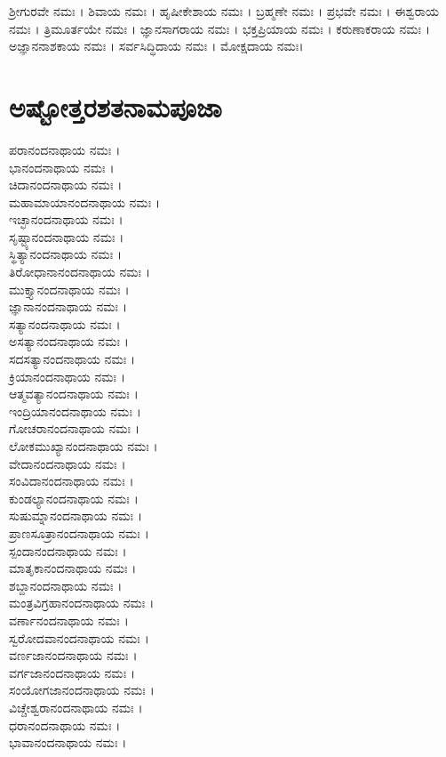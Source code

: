 ಶ್ರೀಗುರವೇ ನಮಃ ।
ಶಿವಾಯ ನಮಃ ।
ಹೃಷೀಕೇಶಾಯ ನಮಃ ।
ಬ್ರಹ್ಮಣೇ ನಮಃ ।
ಪ್ರಭವೇ ನಮಃ ।
ಈಶ್ವರಾಯ ನಮಃ ।
ತ್ರಿಮೂರ್ತಯೇ ನಮಃ ।
ಜ್ಞಾನಸಾಗರಾಯ ನಮಃ ।
ಭಕ್ತಪ್ರಿಯಾಯ ನಮಃ ।
ಕರುಣಾಕರಾಯ ನಮಃ ।
ಅಜ್ಞಾನನಾಶಕಾಯ ನಮಃ ।
ಸರ್ವಸಿದ್ಧಿದಾಯ ನಮಃ ।
ಮೋಕ್ಷದಾಯ ನಮಃ।
\section{ಅಷ್ಟೋತ್ತರಶತನಾಮಪೂಜಾ}
ಪರಾನಂದನಾಥಾಯ ನಮಃ ।\\
ಭಾನಂದನಾಥಾಯ ನಮಃ ।\\
ಚಿದಾನಂದನಾಥಾಯ ನಮಃ ।\\
ಮಹಾಮಾಯಾನಂದನಾಥಾಯ ನಮಃ ।\\
ಇಚ್ಛಾನಂದನಾಥಾಯ ನಮಃ ।\\
ಸೃಷ್ಟ್ಯಾನಂದನಾಥಾಯ ನಮಃ ।\\
ಸ್ಥಿತ್ಯಾನಂದನಾಥಾಯ ನಮಃ ।\\
ತಿರೋಧಾನಾನಂದನಾಥಾಯ ನಮಃ ।\\
ಮುಕ್ತ್ಯಾನಂದನಾಥಾಯ ನಮಃ ।\\
ಜ್ಞಾನಾನಂದನಾಥಾಯ ನಮಃ ।\\
ಸತ್ಯಾನಂದನಾಥಾಯ ನಮಃ ।\\
ಅಸತ್ಯಾನಂದನಾಥಾಯ ನಮಃ ।\\
ಸದಸತ್ಯಾನಂದನಾಥಾಯ ನಮಃ ।\\
ಕ್ರಿಯಾನಂದನಾಥಾಯ ನಮಃ ।\\
ಆತ್ಮವತ್ಯಾನಂದನಾಥಾಯ ನಮಃ ।\\
ಇಂದ್ರಿಯಾನಂದನಾಥಾಯ ನಮಃ ।\\
ಗೋಚರಾನಂದನಾಥಾಯ ನಮಃ ।\\
ಲೋಕಮುಖ್ಯಾನಂದನಾಥಾಯ ನಮಃ ।\\
ವೇದಾನಂದನಾಥಾಯ ನಮಃ ।\\
ಸಂವಿದಾನಂದನಾಥಾಯ ನಮಃ ।\\
ಕುಂಡಲ್ಯಾನಂದನಾಥಾಯ ನಮಃ ।\\
ಸುಷುಮ್ನಾನಂದನಾಥಾಯ ನಮಃ ।\\
ಪ್ರಾಣಸೂತ್ರಾನಂದನಾಥಾಯ ನಮಃ ।\\
ಸ್ಪಂದಾನಂದನಾಥಾಯ ನಮಃ ।\\
ಮಾತೃಕಾನಂದನಾಥಾಯ ನಮಃ ।\\
ಶಬ್ದಾನಂದನಾಥಾಯ ನಮಃ ।\\
ಮಂತ್ರವಿಗ್ರಹಾನಂದನಾಥಾಯ ನಮಃ ।\\
ವರ್ಣಾನಂದನಾಥಾಯ ನಮಃ ।\\
ಸ್ವರೋದವಾನಂದನಾಥಾಯ ನಮಃ ।\\
ವರ್ಣಜಾನಂದನಾಥಾಯ ನಮಃ ।\\
ವರ್ಗಜಾನಂದನಾಥಾಯ ನಮಃ ।\\
ಸಂಯೋಗಜಾನಂದನಾಥಾಯ ನಮಃ ।\\
ವಿಚ್ಚೇಶ್ವರಾನಂದನಾಥಾಯ ನಮಃ ।\\
ಧರಾನಂದನಾಥಾಯ ನಮಃ ।\\
ಭಾವಾನಂದನಾಥಾಯ ನಮಃ ।\\
